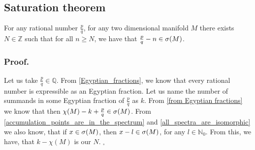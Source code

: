 \subsection{Saturation theorem}
\begin{theorem}\label{saturation theorem}
For any rational number $\frac{p}{q}$, for any two dimensional manifold $M$
there exists $N\in\mathbb{Z}$ such that 
for all $n \geq N$, we have that $\frac{p}{q} - n \in {{\sigma}(M)}$.
\end{theorem}
\subsubsection{Proof.}
Let us take $\frac{p}{q} \in \mathbb{Q}$. 
From \ref{Egyptian_fractions}, 
we know that every rational number is expressible as an Egyptian 
fraction. 
Let us name the number of summands in some Egyptian fraction of $\frac{p}{q}$ 
as $k$. From \ref{from Egyptian fractions} we know that then 
$\chi(M) - k + \frac{p}{q} \in {{\sigma}(M)}$. From \ref{accumulation_points_are_in_the_spectrum} 
and \ref{all_spectra_are_isomorphic} we also know, 
that if $x \in {{\sigma}(M)}$, then $x - l\in{{\sigma}(M)}$, for any $l \in \mathbb{N}_0$. 
From this, we have, that 
$k-\chi(M)$ is our $N$. 
$_\square$

